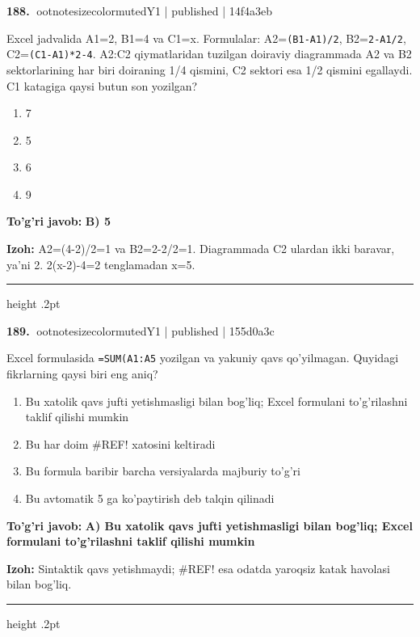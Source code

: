 \documentclass[10pt,a4paper]{article}
\begin{document}
\textbf{\color{ink}188.} {ootnotesizecolor{muted}Y1 | published | 14f4a3eb}
\par
Excel jadvalida A1=2, B1=4 va C1=x. Formulalar: A2=\texttt{(B1-A1)/2}, B2=\texttt{2-A1/2}, C2=\texttt{(C1-A1)*2-4}. A2:C2 qiymatlaridan tuzilgan doiraviy diagrammada A2 va B2 sektorlarining har biri doiraning 1/4 qismini, C2 sektori esa 1/2 qismini egallaydi. C1 katagiga qaysi butun son yozilgan?
\begin{enumerate}[label=\Alph*),leftmargin=9mm]
\item 7
\item 5
\item 6
\item 9
\end{enumerate}
\begin{tcolorbox}[enhanced,breakable,colback=teal!4,colframe=teal!55!black,boxrule=0.45pt,arc=1.2mm,left=2.8mm,right=2.8mm,top=2mm,bottom=2mm]
\textbf{\color{teal}To'g'ri javob:} \textbf{B) 5}
\par\smallskip
\textbf{Izoh:} A2=(4-2)/2=1 va B2=2-2/2=1. Diagrammada C2 ulardan ikki baravar, ya'ni 2. 2(x-2)-4=2 tenglamadan x=5.
\end{tcolorbox}
\vspace{2mm}\hrule height .2pt\vspace{2mm}

\textbf{\color{ink}189.} {ootnotesizecolor{muted}Y1 | published | 155d0a3c}
\par
Excel formulasida \texttt{=SUM(A1:A5} yozilgan va yakuniy qavs qo'yilmagan. Quyidagi fikrlarning qaysi biri eng aniq?
\begin{enumerate}[label=\Alph*),leftmargin=9mm]
\item Bu xatolik qavs jufti yetishmasligi bilan bog'liq; Excel formulani to'g'rilashni taklif qilishi mumkin
\item Bu har doim \#REF! xatosini keltiradi
\item Bu formula baribir barcha versiyalarda majburiy to'g'ri
\item Bu avtomatik 5 ga ko'paytirish deb talqin qilinadi
\end{enumerate}
\begin{tcolorbox}[enhanced,breakable,colback=teal!4,colframe=teal!55!black,boxrule=0.45pt,arc=1.2mm,left=2.8mm,right=2.8mm,top=2mm,bottom=2mm]
\textbf{\color{teal}To'g'ri javob:} \textbf{A) Bu xatolik qavs jufti yetishmasligi bilan bog'liq; Excel formulani to'g'rilashni taklif qilishi mumkin}
\par\smallskip
\textbf{Izoh:} Sintaktik qavs yetishmaydi; \#REF! esa odatda yaroqsiz katak havolasi bilan bog'liq.
\end{tcolorbox}
\vspace{2mm}\hrule height .2pt\vspace{2mm}
\end{document}
